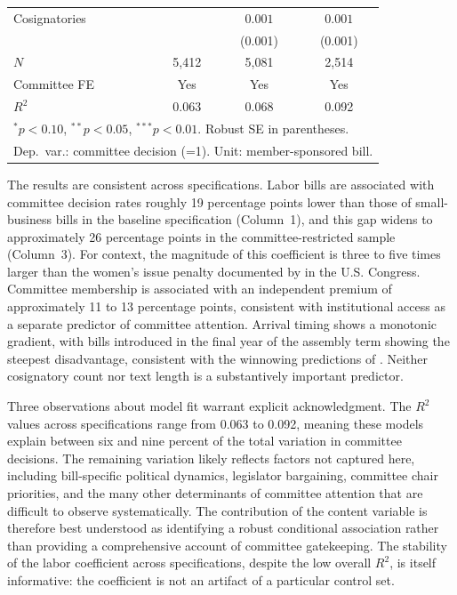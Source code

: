 \documentclass[11pt]{article}
\begin{document}
\begin{table}[H]
\begin{tabular}{lccc}
Cosignatories            &                & $0.001$        & $0.001$        \\
                         &                & (0.001)        & (0.001)        \\
\midrule
$N$                      & 5,412          & 5,081          & 2,514          \\
Committee FE             & Yes            & Yes            & Yes            \\
$R^2$                    & 0.063          & 0.068          & 0.092          \\
\bottomrule
\multicolumn{4}{l}{\footnotesize $^{*}p<0.10$, $^{**}p<0.05$, $^{***}p<0.01$. Robust SE in parentheses.} \\
\multicolumn{4}{l}{\footnotesize Dep.\ var.: committee decision (=1). Unit: member-sponsored bill.} \\
\end{tabular}
\end{table}

The results are consistent across specifications. Labor bills are associated with committee decision rates roughly 19 percentage points lower than those of small-business bills in the baseline specification (Column~1), and this gap widens to approximately 26 percentage points in the committee-restricted sample (Column~3). For context, the magnitude of this coefficient is three to five times larger than the women's issue penalty documented by \citet{volden2016} in the U.S. Congress. Committee membership is associated with an independent premium of approximately 11 to 13 percentage points, consistent with institutional access as a separate predictor of committee attention. Arrival timing shows a monotonic gradient, with bills introduced in the final year of the assembly term showing the steepest disadvantage, consistent with the winnowing predictions of \citet{krutz2005}. Neither cosignatory count nor text length is a substantively important predictor.

Three observations about model fit warrant explicit acknowledgment. The $R^2$ values across specifications range from 0.063 to 0.092, meaning these models explain between six and nine percent of the total variation in committee decisions. The remaining variation likely reflects factors not captured here, including bill-specific political dynamics, legislator bargaining, committee chair priorities, and the many other determinants of committee attention that are difficult to observe systematically. The contribution of the content variable is therefore best understood as identifying a robust conditional association rather than providing a comprehensive account of committee gatekeeping. The stability of the labor coefficient across specifications, despite the low overall $R^2$, is itself informative: the coefficient is not an artifact of a particular control set.
\end{document}
